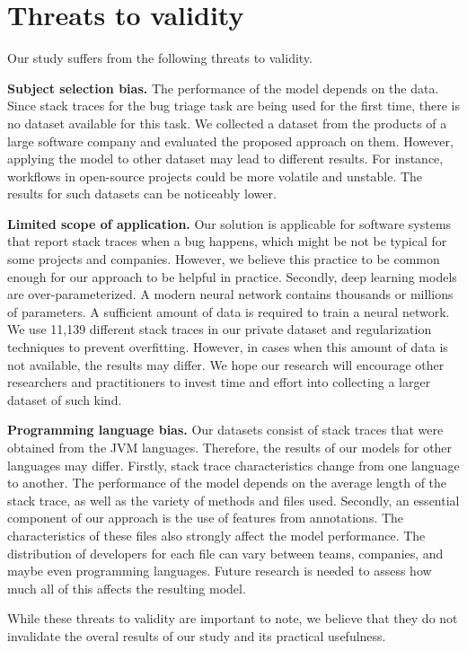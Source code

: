 \section{Threats to validity}\label{sec:threats-to-validity}
Our study suffers from the following threats to validity.

\textbf{Subject selection bias.} The performance of the model depends on the data. Since stack traces for the bug triage task are being used for the first time, there is no dataset available for this task. We collected a dataset from the products of a large software company and evaluated the proposed approach on them. However, applying the model to other dataset may lead to different results. For instance, workflows in open-source projects could be more volatile and unstable. The results for such datasets can be noticeably lower.

\textbf{Limited scope of application.} Our solution is applicable for software systems that report stack traces when a bug happens, which might be not be typical for some projects and companies. However, we believe this practice to be common enough for our approach to be helpful in practice. 
Secondly, deep learning models are over-parameterized. A modern neural network contains thousands or millions of parameters. A sufficient amount of data is required to train a neural network. We use 11,139 different stack traces in our private dataset and regularization techniques to prevent overfitting. However, in cases when this amount of data is not available, the results may differ. We hope our research will encourage other researchers and practitioners to invest time and effort into collecting a larger dataset of such kind.

\textbf{Programming language bias.} Our datasets consist of stack traces that were obtained from the JVM languages. Therefore, the results of our models for other languages may differ. Firstly, stack trace characteristics change from one language to another. The performance of the model depends on the average length of the stack trace, as well as the variety of methods and files used. Secondly, an essential component of our approach is the use of features from annotations. The characteristics of these files also strongly affect the model performance. The distribution of developers for each file can vary between teams, companies, and maybe even programming languages. Future research is needed to assess how much all of this affects the resulting model. 

While these threats to validity are important to note, we believe that they do not invalidate the overal results of our study and its practical usefulness.